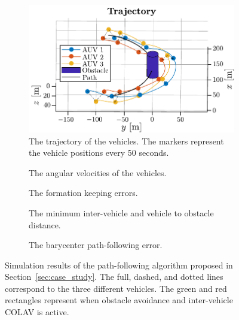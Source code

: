 \begin{figure}[p]
    \centering
    \begin{subfigure}{0.9\textwidth}
        \centering
       \includegraphics[width=.75\linewidth]{figures/handpos_nsb/3d_plot_alternative_view.pdf}
       \caption{The trajectory of the vehicles. The markers represent the vehicle positions every 50 seconds.}
       \label{fig:3d_plot}
   \end{subfigure}
    \begin{subfigure}[t]{.48\textwidth}
    \centering
    \def\figurewidth{.75\linewidth}
    \def\figureheight{2.5cm}
    
    \vspace*{-1.7mm}
    \caption{The angular velocities of the vehicles. }
    \label{fig:angular_velocities}
    \end{subfigure}
    \begin{subfigure}[t]{.48\textwidth}
    \centering
    \def\figurewidth{.75\linewidth}
    \def\figureheight{2.5cm}
    
    \vspace*{-1.7mm}
    \caption{The formation keeping errors. }
    \label{fig:formation_keeping_error}
    \end{subfigure}
    \begin{subfigure}[t]{.48\textwidth}
    \centering
    \def\figurewidth{.75\linewidth}
    \def\figureheight{2.5cm}
    
    \vspace*{-1.8mm}
    \caption{The minimum inter-vehicle and vehicle to obstacle distance.}
    \label{fig:collision_avoidance}
    \end{subfigure}
    \begin{subfigure}[t]{.48\textwidth}
    \centering
    \def\figurewidth{.75\linewidth}
    \def\figureheight{2.5cm}
    
    \vspace*{-1.7mm}
    \caption{The barycenter path-following error.}
    \label{fig:path_following_error}
    \end{subfigure}
    \caption{Simulation results of the path-following algorithm proposed in Section~\ref{sec:case_study}. The full, dashed, and dotted lines correspond to the three different vehicles. The green and red rectangles represent when obstacle avoidance and inter-vehicle COLAV is active.}
    \label{fig:sim_results}
\end{figure}

